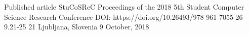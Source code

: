 



\begin{cvhonors}

  \cvhonor
    {Published article} %
    {StuCoSReC Proceedings of the 2018 5th Student Computer Science Research Conference DOI: https://doi.org/10.26493/978-961-7055-26-9.21-25 21} %
    {Ljubljana, Slovenia} %
    {9 October, 2018} %

\end{cvhonors}

